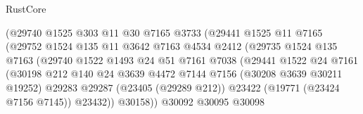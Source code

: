 \begin{lexlean}{RustCore}
\begin{coremodule}
                                  (@29740
                                    @1525
                                    @303
                                    @11
                                    @30
                                    @7165
                                    @3733
                                    (@29441
                                      @1525
                                      @11
                                      @7165
                                      (@29752
                                        @1524
                                        @135
                                        @11
                                        @3642
                                        @7163
                                        @4534
                                        @2412
                                        (@29735
                                          @1524
                                          @135
                                          @7163
                                          (@29740
                                            @1522
                                            @1493
                                            @24
                                            @51
                                            @7161
                                            @7038
                                            (@29441
                                              @1522
                                              @24
                                              @7161
                                              (@30198
                                                @212
                                                @140
                                                @24
                                                @3639
                                                @4472
                                                @7144
                                                @7156
                                                (@30208 @3639 @30211 @19252)
                                                @29283
                                                @29287
                                                (@23405 (@29289 @212))
                                                @23422
                                                (@19771 (@23424 @7156 @7145))
                                                @23432))
                                            @30158))
                                        @30092
                                        @30095
                                        @30098

\end{coremodule}
\end{lexlean}
